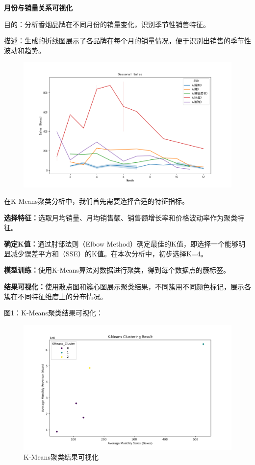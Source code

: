 \documentclass[a4paper]{article}
\begin{document}
\textbf{月份与销量关系可视化}

目的：分析香烟品牌在不同月份的销量变化，识别季节性销售特征。

描述：生成的折线图展示了各品牌在每个月的销量情况，便于识别出销售的季节性波动和趋势。

\begin{figure}[H]
	\centering
	\includegraphics[width=1.0\textwidth]{img/Figure_5.png}
\end{figure}

在K-Means聚类分析中，我们首先需要选择合适的特征指标。

\textbf{选择特征：}选取月均销量、月均销售额、销售额增长率和价格波动率作为聚类特征。

\textbf{确定K值：}通过肘部法则（Elbow Method）确定最佳的K值，即选择一个能够明显减少误差平方和（SSE）的K值。在本次分析中，初步选择K=4。

\textbf{模型训练：}使用K-Means算法对数据进行聚类，得到每个数据点的簇标签。

\textbf{结果可视化：}使用散点图和簇心图展示聚类结果，不同簇用不同颜色标记，展示各簇在不同特征维度上的分布情况。

图1：K-Means聚类结果可视化：

\begin{figure}[H]
	\centering
	\includegraphics[width=1.0\textwidth]{img/Figure_1.png}
	\caption{K-Means聚类结果可视化}
\end{figure}
\end{document}
